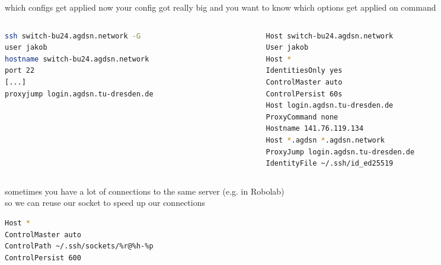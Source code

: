 \documentclass[10pt,graphics,aspectratio=169,table]{beamer}
\begin{document}
\begin{frame}[fragile]{which configs get applied}
    now your config got really big and you want to know which options get applied on command
    \begin{columns}
        \begin{column}{0.5\textwidth}
            \begin{lstlisting}[language=bash]
ssh switch-bu24.agdsn.network -G
user jakob
hostname switch-bu24.agdsn.network
port 22
[...]
proxyjump login.agdsn.tu-dresden.de
    \end{lstlisting}
    \end{column}
        \begin{column}{0.5\textwidth}
            \begin{lstlisting}[language=bash]
Host switch-bu24.agdsn.network
User jakob
Host *
IdentitiesOnly yes
ControlMaster auto
ControlPersist 60s
Host login.agdsn.tu-dresden.de
ProxyCommand none
Hostname 141.76.119.134
Host *.agdsn *.agdsn.network
ProxyJump login.agdsn.tu-dresden.de
IdentityFile ~/.ssh/id_ed25519
        \end{lstlisting}
    \end{column}
    \end{columns}
\end{frame}
\begin{frame}[fragile]
    sometimes you have a lot of connections to the same server (e.g. in Robolab)\\
so we can reuse our socket to speed up our connections
    \begin{lstlisting}[language=bash]
Host *
ControlMaster auto
ControlPath ~/.ssh/sockets/%r@%h-%p
ControlPersist 600
    \end{lstlisting}
\end{frame}
\end{document}
